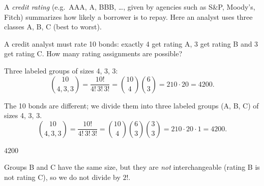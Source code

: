 
\begin{problem}
	\begin{context}
		A \emph{credit rating} (e.g.\ AAA, A, BBB, \ldots, given by
		agencies such as S\&P, Moody's, Fitch) summarizes how likely a borrower is
		to repay. Here an analyst uses three classes A, B, C (best to worst).
	\end{context}
	A credit analyst must rate 10 bonds: exactly 4 get rating A, 3 get
	rating B and 3 get rating C. How many rating assignments are possible?
\end{problem}

\begin{slides}
	\small
	\exstatement
	\pause
	\sol Three labeled groups of sizes 4, 3, 3:
	\[ \binom{10}{4,3,3} = \frac{10!}{4!\,3!\,3!}
		= \binom{10}{4}\binom63 = 210\cdot 20 = 4200. \]
\end{slides}

\begin{solution}
	\idea The 10 bonds are different; we divide them into three labeled groups
	(A, B, C) of sizes 4, 3, 3.
	\[ \binom{10}{4,3,3}=\frac{10!}{4!\,3!\,3!}=\binom{10}{4}\binom63\binom33
		=210\cdot20\cdot1=4200. \]
	\begin{answer}
		$4200$
	\end{answer}
	\begin{remark}
		Groups B and C have the same size, but they are \emph{not} interchangeable
		(rating B is not rating C), so we do not divide by $2!$.
	\end{remark}
\end{solution}

